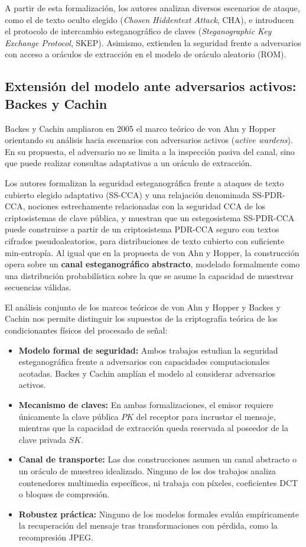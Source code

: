 \documentclass[IB]{TFUOC}%
\begin{document}
A partir de esta formalización, los autores analizan diversos escenarios de ataque, como el de texto oculto elegido (\textit{Chosen Hiddentext Attack}, CHA), e introducen el protocolo de intercambio esteganográfico de claves (\textit{Steganographic Key Exchange Protocol}, SKEP). Asimismo, extienden la seguridad frente a adversarios con acceso a oráculos de extracción en el modelo de oráculo aleatorio (ROM).

\subsection{Extensión del modelo ante adversarios activos: Backes y Cachin}

Backes y Cachin \cite{19} ampliaron en 2005 el marco teórico de von Ahn y Hopper orientando su análisis hacia escenarios con adversarios activos (\textit{active wardens}). En su propuesta, el adversario no se limita a la inspección pasiva del canal, sino que puede realizar consultas adaptativas a un oráculo de extracción.

Los autores formalizan la seguridad esteganográfica frente a ataques de texto cubierto elegido adaptativo (SS-CCA) y una relajación denominada SS-PDR-CCA, nociones estrechamente relacionadas con la seguridad CCA de los criptosistemas de clave pública, y muestran que un estegosistema SS-PDR-CCA puede construirse a partir de un criptosistema PDR-CCA seguro con textos cifrados pseudoaleatorios, para distribuciones de texto cubierto con suficiente min-entropía. Al igual que en la propuesta de von Ahn y Hopper, la construcción opera sobre un \textbf{canal esteganográfico abstracto}, modelado formalmente como una distribución probabilística sobre la que se asume la capacidad de muestrear secuencias válidas.

El análisis conjunto de los marcos teóricos de von Ahn y Hopper \cite{4} y Backes y Cachin \cite{19} nos permite distinguir los supuestos de la criptografía teórica de los condicionantes físicos del procesado de señal:

\begin{itemize}
    \item \textbf{Modelo formal de seguridad:} Ambos trabajos estudian la seguridad esteganográfica frente a adversarios con capacidades computacionales acotadas. Backes y Cachin amplían el modelo al considerar adversarios activos.
    \item \textbf{Mecanismo de claves:} En ambas formalizaciones, el emisor requiere únicamente la clave pública $PK$ del receptor para incrustar el mensaje, mientras que la capacidad de extracción queda reservada al poseedor de la clave privada $SK$.
    \item \textbf{Canal de transporte:} Las dos construcciones asumen un canal abstracto o un oráculo de muestreo idealizado. Ninguno de los dos trabajos analiza contenedores multimedia específicos, ni trabaja con píxeles, coeficientes DCT o bloques de compresión.
    \item \textbf{Robustez práctica:} Ninguno de los modelos formales evalúa empíricamente la recuperación del mensaje tras transformaciones con pérdida, como la recompresión JPEG.
\end{itemize}
\end{document}
